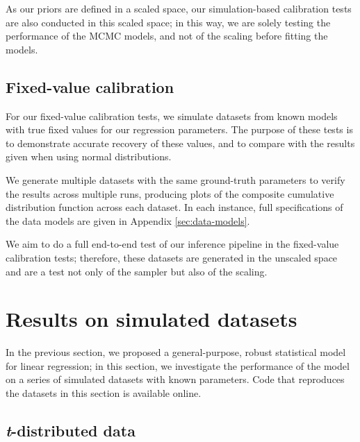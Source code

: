 \documentclass[fleqn,usenatbib]{rasti}
\begin{document}
As our priors are defined in a scaled space, our simulation-based calibration
tests are also conducted in this scaled space; in this way, we are solely
testing the performance of the MCMC models, and not of the scaling before
fitting the models.

\subsection{Fixed-value calibration}
\label{sec:methods.fixed}

For our fixed-value calibration tests, we simulate datasets from known models
with true fixed values for our regression parameters. The purpose of these tests
is to demonstrate accurate recovery of these values, and to compare with the
results given when using normal distributions.

We generate multiple datasets with the same ground-truth parameters to verify
the results across multiple runs, producing plots of the composite cumulative
distribution function across each dataset. In each instance, full specifications
of the data models are given in Appendix \ref{sec:data-models}.

We aim to do a full end-to-end test of our inference pipeline in the fixed-value
calibration tests; therefore, these datasets are generated in the unscaled space
and are a test not only of the sampler but also of the scaling.

\section{Results on simulated datasets}
\label{sec:results}

In the previous section, we proposed a general-purpose, robust statistical model
for linear regression; in this section, we investigate the performance of the
model on a series of simulated datasets with known parameters. Code that
reproduces the datasets in this section is available online\footnotemark.


\subsection{\textit{t}-distributed data}
\label{sec:results.t}
\end{document}
